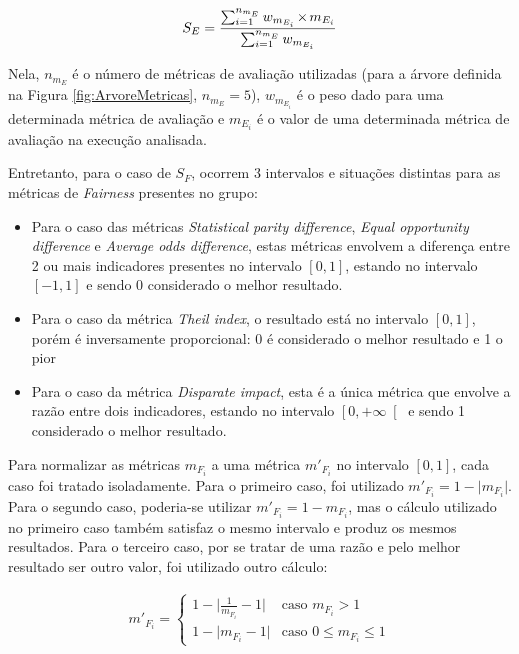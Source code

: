 \documentclass[portugues]{ic-tese}
\let\oldtimes\times
\def\times{{\mkern1mu\oldtimes\mkern1mu}}
\begin{document}
\begin{equation}
\label{eqn:EvaluationScore}
	\begin{aligned}
	S_{E} = \frac{\sum_{i=1}^{n_{m_E}} w_{m_{E_i}} \times m_{E_{i}}}{\sum_{i=1}^{n_{m_E}} w_{m_{E_i}}}
	\end{aligned}
\end{equation}

Nela, $n_{m_E}$ é o número de métricas de avaliação utilizadas (para a árvore definida na Figura \ref{fig:ArvoreMetricas}, $n_{m_E} = 5$), $w_{m_{E_i}}$ é o peso dado para uma determinada métrica de avaliação e $m_{E_{i}}$ é o valor de uma determinada métrica de avaliação na execução analisada.

Entretanto, para o caso de $S_F$, ocorrem 3 intervalos e situações distintas para as métricas de \textit{Fairness} presentes no grupo:

\begin{itemize}
	\item Para o caso das métricas \textit{Statistical parity difference}, \textit{Equal opportunity difference} e \textit{Average odds difference}, estas métricas envolvem a diferença entre 2 ou mais indicadores presentes no intervalo $\left[0,1 \right]$, estando no intervalo $\left[-1,1 \right]$ e sendo 0 considerado o melhor resultado.
	\item Para o caso da métrica \textit{Theil index}, o resultado está no intervalo $\left[0,1 \right]$, porém é inversamente proporcional: 0 é considerado o melhor resultado e 1 o pior
	\item Para o caso da métrica \textit{Disparate impact}, esta é a única métrica que envolve a razão entre dois indicadores, estando no intervalo $\left[0,+\infty \right[$ e sendo 1 considerado o melhor resultado.
\end{itemize}

Para normalizar as métricas $m_{F_i}$ a uma métrica $m'_{F_i}$ no intervalo $\left[0,1 \right]$, cada caso foi tratado isoladamente. Para o primeiro caso, foi utilizado $m'_{F_i} = 1-\lvert m_{F_i} \rvert$. Para o segundo caso, poderia-se utilizar $m'_{F_i} = 1-m_{F_i}$, mas o cálculo utilizado no primeiro caso também satisfaz o mesmo intervalo e produz os mesmos resultados. Para o terceiro caso, por se tratar de uma razão e pelo melhor resultado ser outro valor, foi utilizado outro cálculo:

\begin{equation}
\label{eqn:normalizationFairnessStep2}
	\begin{aligned}
	m'_{F_i} = 
	\begin{cases}
	1-\lvert \frac{1}{m_{F_i}}-1 \lvert & \text{caso $m_{F_i} > 1$}\\
	1-\lvert m_{F_i}-1 \lvert & \text{caso $0 \leqslant m_{F_i} \leqslant 1$}
	\end{cases}
	\end{aligned}
\end{equation}
\end{document}
